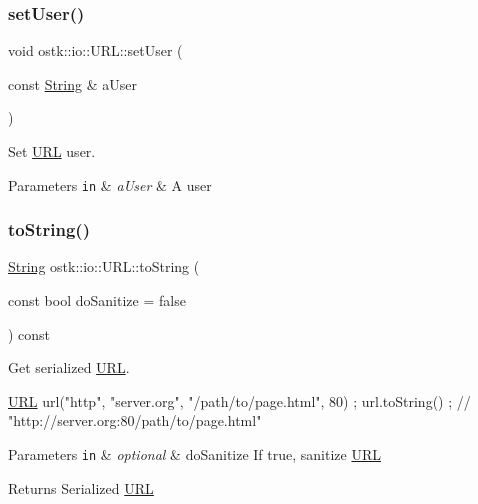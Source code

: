 \subsubsection{\texorpdfstring{set\+User()}{setUser()}}
{\footnotesize\ttfamily void ostk\+::io\+::\+U\+R\+L\+::set\+User (\begin{DoxyParamCaption}\item[{const \hyperlink{namespaceostk_1_1io_a95d49b120613a7610cb1b4f03b1116b6}{String} \&}]{a\+User }\end{DoxyParamCaption})}



Set \hyperlink{classostk_1_1io_1_1_u_r_l}{U\+RL} user. 


\begin{DoxyParams}[1]{Parameters}
\mbox{\tt in}  & {\em a\+User} & A user \\
\hline
\end{DoxyParams}
\mbox{\label{classostk_1_1io_1_1_u_r_l_af1b7bd5cffeda8dcbf7e469f68bc8f0f}} 
\subsubsection{\texorpdfstring{to\+String()}{toString()}}
{\footnotesize\ttfamily \hyperlink{namespaceostk_1_1io_a95d49b120613a7610cb1b4f03b1116b6}{String} ostk\+::io\+::\+U\+R\+L\+::to\+String (\begin{DoxyParamCaption}\item[{const bool}]{do\+Sanitize = {\ttfamily false} }\end{DoxyParamCaption}) const}



Get serialized \hyperlink{classostk_1_1io_1_1_u_r_l}{U\+RL}. 


\begin{DoxyCode}
\hyperlink{classostk_1_1io_1_1_u_r_l_a2537e046cef4ac966cc295abb81279c2}{URL} url(\textcolor{stringliteral}{"http"}, \textcolor{stringliteral}{"server.org"}, \textcolor{stringliteral}{"/path/to/page.html"}, 80) ;
url.toString() ; \textcolor{comment}{// "http://server.org:80/path/to/page.html"}
\end{DoxyCode}



\begin{DoxyParams}[1]{Parameters}
\mbox{\tt in}  & {\em optional} & do\+Sanitize If true, sanitize \hyperlink{classostk_1_1io_1_1_u_r_l}{U\+RL} \\
\hline
\end{DoxyParams}
\begin{DoxyReturn}{Returns}
Serialized \hyperlink{classostk_1_1io_1_1_u_r_l}{U\+RL} 
\end{DoxyReturn}
\mbox{\label{classostk_1_1io_1_1_u_r_l_a668bfbf59c42356063be619b5f39d613}} 
